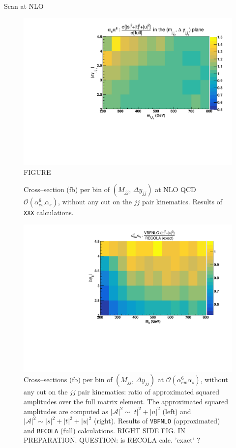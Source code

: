 Scan at NLO

\begin{figure}[hbt]
\centering
\includegraphics[scale=0.39]{figures/scanfigures/a6as_vbfnloVSrecola_stu.pdf}
FIGURE
\caption{Cross--section (fb) per bin of $(M_{jj},\,\Delta y_{jj})$ at NLO QCD $\mathcal{O}(\alpha_{ew}^6\alpha_s)$, without any cut on the $jj$ pair kinematics. Results of \texttt{XXX} calculations.}\label{fig:mjjdyjj_2d_NLO}
\end{figure}


\begin{figure}[hbt]
\centering
\includegraphics[scale=0.395]{figures/scanfigures/a6as_vbfnloVSrecola_tu.pdf}
\caption{Cross--sections (fb) per bin of $(M_{jj},\,\Delta y_{jj})$ at $\mathcal{O}(\alpha_{ew}^6\alpha_s)$, without any cut on the $jj$ pair kinematics: ratio of approximated squared amplitudes over the full matrix element. The approximated squared amplitudes are computed as $|\mathcal{A}|^2 \sim |t|^2 + |u|^2$ (left) and $|\mathcal{A}|^2 \sim |s|^2 + |t|^2 + |u|^2$ (right). Results of \texttt{VBFNLO} (approximated) and \texttt{RECOLA} (full) calculations. RIGHT SIDE FIG. IN PREPARATION. QUESTION: is RECOLA calc. 'exact' ?}\label{fig:ratio2d_NLO}
\end{figure}